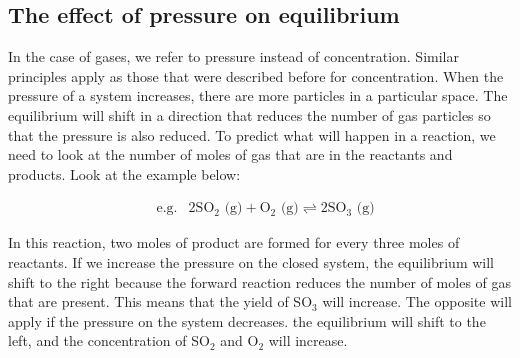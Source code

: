 {
}

\subsection{The effect of pressure on equilibrium}

In the case of gases, we refer to pressure instead of concentration. Similar principles apply as those that were described before for concentration. When the pressure of a system increases, there are more particles in a particular space. The equilibrium will shift in a direction that reduces the number of gas particles so that the pressure is also reduced. To predict what will happen in a reaction, we need to look at the number of moles of gas that are in the reactants and products. Look at the example below:

\begin{eqnarray*}
  & \text{e.g.} & 2\text{SO}_{2}\text{ (g)} + \text{O}_{2}\text{ (g)} \rightleftharpoons 2\text{SO}_{3}\text{ (g)}
\end{eqnarray*}

In this reaction, two moles of product are formed for every three moles of reactants. If we increase the pressure on the closed system, the equilibrium will shift to the right because the forward reaction reduces the number of moles of gas that are present. This means that the yield of SO$_{3}$ will increase. The opposite will apply if the pressure on the system decreases. the equilibrium will shift to the left, and the concentration of SO$_{2}$ and O$_{2}$ will increase. 


